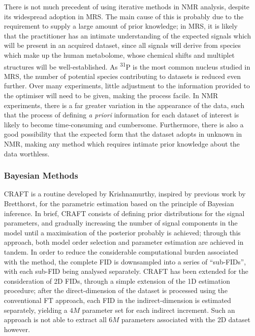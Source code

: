 There is not much precedent of using iterative methods in \ac{NMR} analysis,
despite its widespread adoption in \ac{MRS}. The main cause of this is probably due to
the requirement to supply a large amount of prior knowledge; in \ac{MRS}, it
is likely that the practitioner has an intimate understanding of the expected signals
which will be present in an acquired dataset, since all signals will derive
from species which make up the human metabolome, whose chemical shifts and multiplet
structures will be well-established. As \textsuperscript{31}P is the most
common nucleus studied in \ac{MRS}, the number of potential species
contributing to datasets is reduced even further. Over many experiments, little
adjustment to the information provided to the optimiser will need to be given,
making the process facile. In \ac{NMR} experiments, there is a far greater
variation in the appearance of the data, such that the process of defining
\textit{a priori} information for each dataset of interest is likely to become
time-consuming and cumbersome. Furthermore, there is also a good possibility
that the expected form that the dataset adopts in unknown in \ac{NMR}, making
any method which requires intimate prior knowledge about the data worthless.

\subsubsection{Bayesian Methods}
\Ac{CRAFT}\cite{Krishnamurthy2013,Krishnamurthy2021} is a routine developed by
Krishnamurthy, inspired by previous work by
Bretthorst\cite{Bretthorst1990a,Bretthorst1990b,Bretthorst1990c,Bretthorst1991,Bretthorst1992},
for the parametric estimation based on the principle of Bayesian inference.
In brief, \ac{CRAFT} consists of defining prior distributions for the signal
parameters, and gradually increasing the number of signal components in the
model until a maximisation of the posterior probably is achieved; through this
approach, both model order selection and parameter estimation are achieved
in tandem. In order to reduce the considerable computational burden associated
with the method, the complete \ac{FID} is downsampled into a series of
``sub-\acp{FID}'', with each sub-\ac{FID} being analysed separately.
\ac{CRAFT} has been extended for the consideration of \ac{2D} \acp{FID},
through a simple extension of the \ac{1D} estimation
procedure\cite{Krishnamurthy2017}; after the direct-dimension of the dataset is
processed using the conventional \ac{FT} approach, each \ac{FID} in the
indirect-dimension is estimated separately, yielding a $4M$ parameter
set for each indirect increment. Such an approach is not able to extract all
$6M$ parameters associated with the \ac{2D} dataset however.

